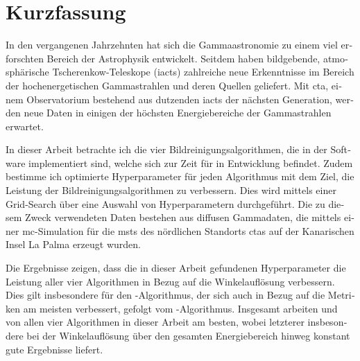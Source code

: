 \section*{Kurzfassung}
\begin{otherlanguage}{ngerman}
In den vergangenen Jahrzehnten hat sich die Gammaastronomie zu einem viel erforschten Bereich der
Astrophysik entwickelt. Seitdem haben bildgebende, atmosphärische Tscherenkow-Teleskope (\glspl{iact})
zahlreiche neue Erkenntnisse im Bereich der hochenergetischen Gammastrahlen und deren Quellen geliefert.
Mit \gls{cta}, einem Observatorium bestehend aus dutzenden \glspl{iact} der nächsten Generation, werden neue Daten in einigen der höchsten
Energiebereiche der Gammastrahlen erwartet.

In dieser Arbeit betrachte ich die vier Bildreinigungsalgorithmen, die in der Software \ctapipe{} implementiert
sind, welche sich zur Zeit für \cta{} in Entwicklung befindet. Zudem bestimme ich optimierte
Hyperparameter für jeden Algorithmus mit dem Ziel, die Leistung der Bildreinigungsalgorithmen zu verbessern.
Dies wird mittels einer Grid-Search über eine Auswahl von Hyperparametern durchgeführt. Die zu diesem
Zweck verwendeten Daten bestehen aus diffusen Gammadaten, die mittels einer \gls{mc}-Simulation für die
\glspl{mst} des nördlichen Standorts \gls{cta}s auf der Kanarischen Insel La Palma erzeugt wurden.

Die Ergebnisse zeigen, dass die in dieser Arbeit gefundenen Hyperparameter die Leistung aller vier
Algorithmen in Bezug auf die Winkelauflösung verbessern. Dies gilt insbesondere für den \tcc{}-Algorithmus,
der sich auch in Bezug auf die Metriken am meisten verbessert, gefolgt vom \mars{}-Algorithmus.
Insgesamt arbeiten \fact{} und \mars{} von allen vier Algorithmen in dieser Arbeit am besten, wobei
letzterer insbesondere bei der Winkelauflösung über den gesamten Energiebereich hinweg
konstant gute Ergebnisse liefert.
\end{otherlanguage}
\glsresetall%
